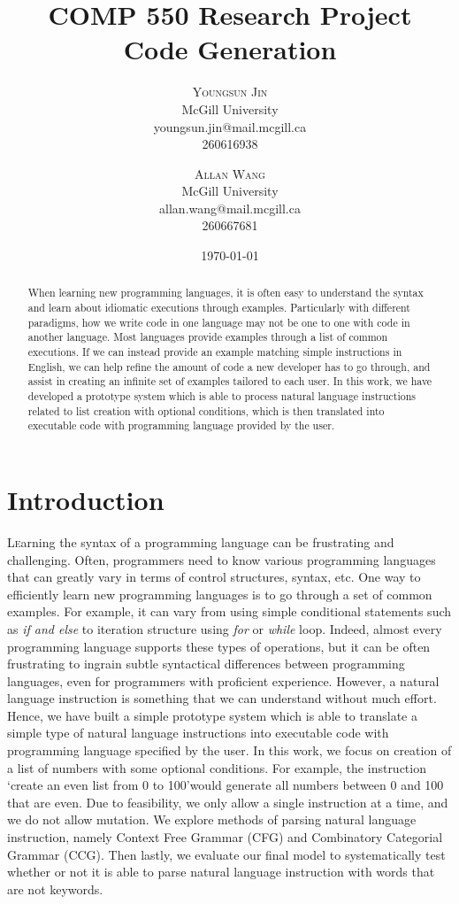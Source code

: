 \documentclass[twoside,twocolumn]{article}
\title{%
	\huge COMP 550 Research Project \\
	\large Code Generation}
\author{%
\textsc{Youngsun Jin} \\
\normalsize McGill University \\ 
\normalsize youngsun.jin@mail.mcgill.ca \\
\normalsize {260616938} 
\and 
\textsc{Allan Wang} \\
\normalsize McGill University \\ 
\normalsize allan.wang@mail.mcgill.ca \\
\normalsize {260667681} 
}
\date{\today} %
\begin{document}
\maketitle


\begin{abstract}
When learning new programming languages, it is often easy to understand the syntax and learn
about idiomatic executions through examples. Particularly with different paradigms, how we
write code in one language may not be one to one with code in another language. Most
languages provide examples through a list of common executions. If we can instead provide an
example matching simple instructions in English, we can help refine the amount of code
a new developer has to go through, and assist in creating an infinite set of examples tailored to
each user. In this work, we have developed a prototype system which is able to process natural language instructions
related to list creation with optional conditions, which is then translated into executable code with programming language provided by the user.  
\end{abstract}
\section{Introduction}

\lettrine[nindent=0em,lines=2]{L}earning the syntax of a programming language can be frustrating and challenging. Often, programmers need to
know various programming languages that can greatly vary in terms of control structures, syntax, etc. One way to efficiently learn new
programming languages is to go through a set of common examples. For example, it can vary from using simple conditional statements such as  \textit{if and else} to iteration structure using \textit{for} or \textit{while} loop. Indeed, almost every programming language supports these types of operations, but it can be often frustrating to ingrain subtle syntactical differences between programming languages, even for programmers with proficient experience. However, a natural language instruction is something that we can understand without much effort. Hence, we have built a simple prototype system which is able to translate a simple type of natural language instructions into executable code with programming language specified by the user. In this work, we focus on creation of a list of numbers with some optional conditions. For example, the instruction \lq create an even list from 0 to 100\rq \enspace would generate all numbers between 0 and 100 that are even. Due to feasibility, we only allow a single instruction at a time, and we do not allow mutation. We explore methods of parsing natural language instruction, namely Context Free Grammar (CFG) and Combinatory Categorial Grammar (CCG). Then lastly, we evaluate our final model to systematically test whether or not it is able to parse natural language instruction with words that are not keywords.     
\end{document}
